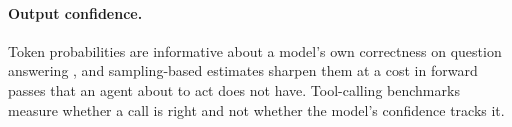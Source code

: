 \paragraph{Output confidence.}
Token probabilities are informative about a model's own correctness on question answering \citep{kadavath2022know}, and sampling-based estimates sharpen them \citep{farquhar2024semantic,manakul2023selfcheckgpt} at a cost in forward passes that an agent about to act does not have. Tool-calling benchmarks measure whether a call is right \citep{patil2025bfcl,patil2024gorilla,qin2024toolllm} and not whether the model's confidence tracks it.
